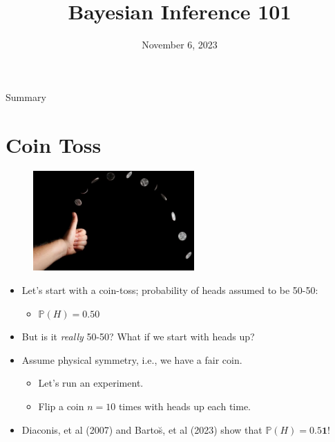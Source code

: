 \documentclass[dvipsnames,mathserif, handout]{beamer}
\begin{document}
\rightskip\rightmargin
\title{Bayesian Inference 101}
\author{ \Large \textbf{} }
\footnotesize{\date{November 6, 2023 }


\begin{frame}
	\maketitle
\end{frame}

\begin{frame}{Summary}
	\footnotesize \tableofcontents
\end{frame}

\section{Coin Toss}

\begin{frame}
    \begin{figure}[!ht]
    	\includegraphics[width=175pt]{CoinToss1.pdf}
    \end{figure}

    \begin{itemize}
    	\item Let's start with a coin-toss; probability of heads assumed to be 50-50:
	\begin{itemize}
		\item  $\mathbb{P} (H) = 0.50$ \pause
	\end{itemize}
    	\item But is it \textit{really} 50-50? What if we start with heads up? \pause
    	\item Assume physical symmetry, i.e., we have a fair coin. \pause
	\begin{itemize}
	    	\item \footnotesize Let's run an experiment.
		\item Flip a coin $n = 10$ times with heads up each time. \pause
	\end{itemize}
	\item Diaconis, et al (2007) and Barto\u{s}, et al (2023) show that $\mathbb{P} (H) = 0.5\textbf{1}$!
    \end{itemize}
\end{frame}

}
\end{document}
